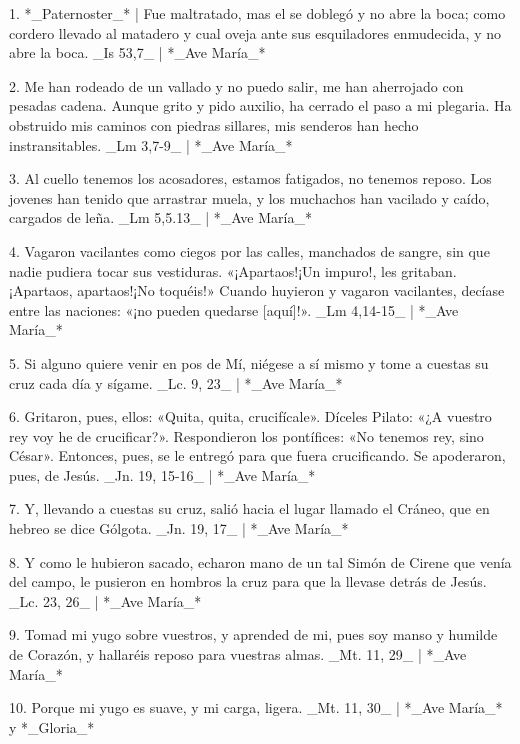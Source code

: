 1. *_Paternoster_* | Fue maltratado, mas el se doblegó y no abre la boca; como cordero llevado al matadero y cual oveja ante sus esquiladores enmudecida, y no abre la boca. _Is 53,7_ | *_Ave María_*

2. Me han rodeado de un vallado y no puedo salir, me han aherrojado con pesadas cadena. Aunque grito y pido auxilio, ha cerrado el paso a mi plegaria. Ha obstruido mis caminos con piedras sillares, mis senderos han hecho instransitables. _Lm 3,7-9_ | *_Ave María_*

3. Al cuello tenemos los acosadores, estamos fatigados, no tenemos reposo. Los jovenes han tenido que arrastrar muela, y los muchachos han vacilado y caído, cargados de leña. _Lm 5,5.13_ | *_Ave María_*

4. Vagaron vacilantes como ciegos por las calles, manchados de sangre, sin que nadie pudiera tocar sus vestiduras. «¡Apartaos!¡Un impuro!, les gritaban. ¡Apartaos, apartaos!¡No toquéis!» Cuando huyieron y vagaron vacilantes, decíase entre las naciones: «¡no pueden quedarse [aquí]!». _Lm 4,14-15_ | *_Ave María_*

5. Si alguno quiere venir en pos de Mí, niégese a sí mismo y tome a cuestas su cruz cada día y sígame. _Lc. 9, 23_ | *_Ave María_*

6. Gritaron, pues, ellos: «Quita, quita, crucifícale». Díceles Pilato: «¿A vuestro rey voy he de crucificar?». Respondieron los pontífices: «No tenemos rey, sino César». Entonces, pues, se le entregó para que fuera crucificando. Se apoderaron, pues, de Jesús. _Jn. 19, 15-16_ | *_Ave María_*

7. Y, llevando a cuestas su cruz, salió hacia el lugar llamado el Cráneo, que en hebreo se dice Gólgota. _Jn. 19, 17_ | *_Ave María_*

8. Y como le hubieron sacado, echaron mano de un tal Simón de Cirene que venía del campo, le pusieron en hombros la cruz para que la llevase detrás de Jesús. _Lc. 23, 26_ | *_Ave María_*

9. Tomad mi yugo sobre vuestros, y aprended de mi, pues soy manso y humilde de Corazón, y hallaréis reposo para vuestras almas. _Mt. 11, 29_ | *_Ave María_*

10. Porque mi yugo es suave, y mi carga, ligera. _Mt. 11, 30_  | *_Ave María_* y *_Gloria_*